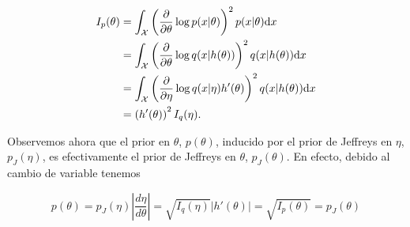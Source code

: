 \begin{align}
	I_p(\theta) &= \int_{\mathcal X}\left(\frac{\partial}{\partial\theta}\log p(x|\theta)\right)^2p(x|\theta){\text{d}} x\\
				&= \int_{\mathcal X}\left(\frac{\partial}{\partial\theta}\log q(x|h(\theta))\right)^2q(x|h(\theta)){\text{d}} x\\
				&= \int_{\mathcal X}\left(\frac{\partial}{\partial\eta}\log q(x|\eta) h'(\theta)\right)^2q(x|h(\theta)){\text{d}} x\\
				&= \left(h'(\theta)\right)^2 I_q(\eta).
\end{align} 

Observemos ahora que el prior en $\theta$, $p(\theta)$, inducido por el prior de Jeffreys en $\eta$, $p_J(\eta)$, es efectivamente el prior de Jeffreys en $\theta$, $p_J(\theta)$. En efecto, debido al cambio de variable tenemos

\begin{equation}
	p(\theta) = p_J(\eta) \left|\frac{d \eta}{d \theta}\right| = \sqrt{I_q(\eta)}\left|h'(\theta)\right| = \sqrt{I_p(\theta)} = p_J(\theta) 
\end{equation}
   
